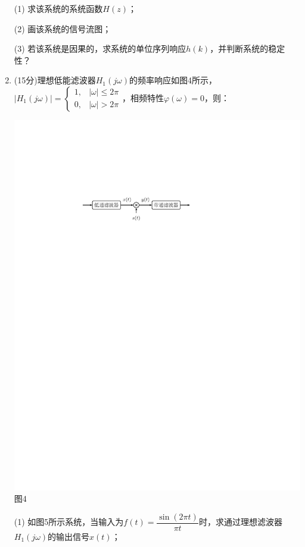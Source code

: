 \documentclass[11pt,twoside]{ctexart}
\begin{document}
\begin{enumerate}[leftmargin=0em]
(1) 求该系统的系统函数$H(z)$；

(2) 画该系统的信号流图；

(3) 若该系统是因果的，求系统的单位序列响应$h(k)$，并判断系统的稳定性？
\vfill\newpage
\item (15分)理想低能滤波器$H_1(j\omega)$的频率响应如图4所示，$|H_1(j\omega)|=\begin{cases}
1,&|\omega|\leqslant 2\pi\\
0,&|\omega|> 2\pi
\end{cases}$，相频特性$\varphi(\omega)=0$，则：
\begin{center}
\includegraphics{img/5.pdf}\\
{图4}
\end{center}
(1) 如图5所示系统，当输入为$f(t)=\dfrac{\sin(2\pi t)}{\pi t}$时，求通过理想滤波器$H_1(j\omega)$的输出信号$x(t)$；


\end{enumerate}
\end{document}
